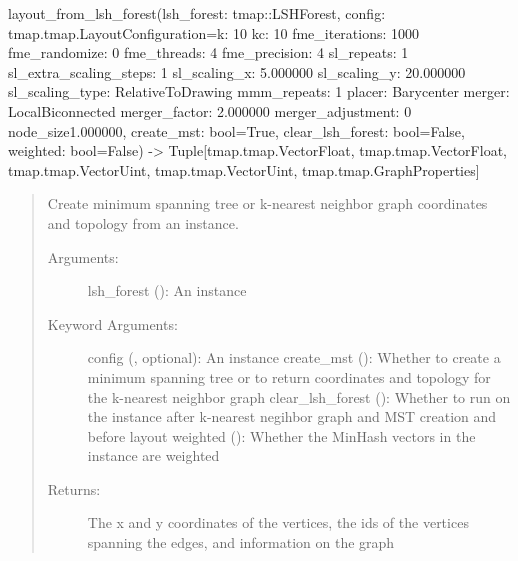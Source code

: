 \documentclass[letterpaper,10pt,english]{sphinxmanual}
\begin{document}
\begin{fulllineitems}
\label{\detokenize{documentation:tmap.layout_from_lsh_forest}}
layout\_from\_lsh\_forest(lsh\_forest: tmap::LSHForest, config: tmap.tmap.LayoutConfiguration=k: 10
kc: 10
fme\_iterations: 1000
fme\_randomize: 0
fme\_threads: 4
fme\_precision: 4
sl\_repeats: 1
sl\_extra\_scaling\_steps: 1
sl\_scaling\_x: 5.000000
sl\_scaling\_y: 20.000000
sl\_scaling\_type: RelativeToDrawing
mmm\_repeats: 1
placer: Barycenter
merger: LocalBiconnected
merger\_factor: 2.000000
merger\_adjustment: 0
node\_size1.000000, create\_mst: bool=True, clear\_lsh\_forest: bool=False, weighted: bool=False) -\textgreater{} Tuple{[}tmap.tmap.VectorFloat, tmap.tmap.VectorFloat, tmap.tmap.VectorUint, tmap.tmap.VectorUint, tmap.tmap.GraphProperties{]}
\begin{quote}

Create minimum spanning tree or k-nearest neighbor graph coordinates and topology from an {\hyperref[\detokenize{documentation:tmap.LSHForest}]{}} instance.
\begin{description}
\item[{Arguments:}] \leavevmode
lsh\_forest ({\hyperref[\detokenize{documentation:tmap.LSHForest}]{}}): An {\hyperref[\detokenize{documentation:tmap.LSHForest}]{}} instance

\item[{Keyword Arguments:}] \leavevmode
config ({\hyperref[\detokenize{documentation:tmap.LayoutConfiguration}]{}}, optional): An {\hyperref[\detokenize{documentation:tmap.LayoutConfiguration}]{}} instance
create\_mst (): Whether to create a minimum spanning tree or to return coordinates and topology for the k-nearest neighbor graph
clear\_lsh\_forest (): Whether to run  on the {\hyperref[\detokenize{documentation:tmap.LSHForest}]{}} instance after k-nearest negihbor graph and MST creation and before layout
weighted (): Whether the MinHash vectors in the {\hyperref[\detokenize{documentation:tmap.LSHForest}]{}} instance are weighted

\item[{Returns:}] \leavevmode
{} The x and y coordinates of the vertices, the ids of the vertices spanning the edges, and information on the graph

\end{description}
\end{quote}

\end{fulllineitems}
\end{document}
